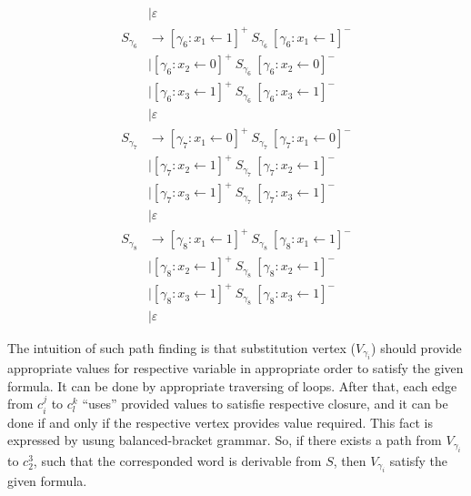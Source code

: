 \begin{align*}
             & \mid \varepsilon \\
S_{\gamma_6} & \to  [\gamma_6:x_1 \leftarrow 1]^+ \ S_{\gamma_6} \ [\gamma_6:x_1 \leftarrow 1]^- \\
             & \mid [\gamma_6:x_2 \leftarrow 0]^+ \ S_{\gamma_6} \ [\gamma_6:x_2 \leftarrow 0]^- \\ 
             & \mid [\gamma_6:x_3 \leftarrow 1]^+ \ S_{\gamma_6} \ [\gamma_6:x_3 \leftarrow 1]^- \\ 
             & \mid \varepsilon \\
S_{\gamma_7} & \to  [\gamma_7:x_1 \leftarrow 0]^+ \ S_{\gamma_7} \ [\gamma_7:x_1 \leftarrow 0]^- \\
             & \mid [\gamma_7:x_2 \leftarrow 1]^+ \ S_{\gamma_7} \ [\gamma_7:x_2 \leftarrow 1]^- \\ 
             & \mid [\gamma_7:x_3 \leftarrow 1]^+ \ S_{\gamma_7} \ [\gamma_7:x_3 \leftarrow 1]^- \\ 
             & \mid \varepsilon \\ 
S_{\gamma_8} & \to  [\gamma_8:x_1 \leftarrow 1]^+ \ S_{\gamma_8} \ [\gamma_8:x_1 \leftarrow 1]^- \\
             & \mid [\gamma_8:x_2 \leftarrow 1]^+ \ S_{\gamma_8} \ [\gamma_8:x_2 \leftarrow 1]^- \\ 
             & \mid [\gamma_8:x_3 \leftarrow 1]^+ \ S_{\gamma_8} \ [\gamma_8:x_3 \leftarrow 1]^- \\ 
             & \mid \varepsilon 
\end{align*}

The intuition of such path finding is that substitution vertex ($V_{\gamma_i}$) should provide appropriate values for respective variable in appropriate order to satisfy the given formula.
It can be done by appropriate traversing of loops. 
After that, each edge from $c_i^j$ to  $c_l^k$ ``uses'' provided values to satisfie respective closure, and it can be done if and only if the respective vertex provides value required.
This fact is expressed by usung balanced-bracket grammar.
So, if there exists a path from $V_{\gamma_i}$ to $c_2^3$, such that the corresponded word is derivable from $S$, then $V_{\gamma_i}$ satisfy the given formula. 


